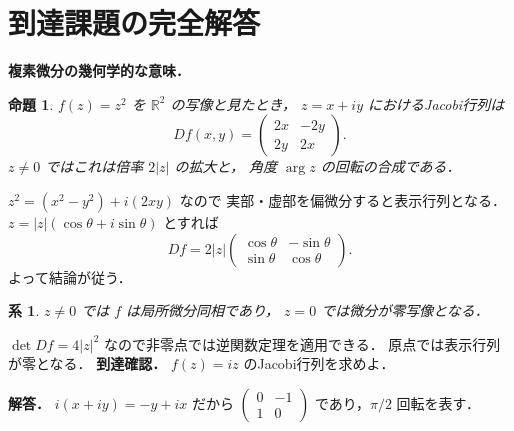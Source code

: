\documentclass[a5paper,10pt,onecolumn]{jsarticle}
\makeatletter
\theoremstyle{mathnotetheorem}
\newtheorem{proposition}[theorem]{命題}
\newtheorem{corollary}[theorem]{系}
\renewcommand{\proofname}{証明}
\renewenvironment{proof}[1][\proofname]{%
  \par\pushQED{\qed}\normalfont\topsep4\p@\@plus2\p@\relax
  \trivlist\item[\hskip\labelsep\bfseries #1]\ignorespaces
}{\popQED\endtrivlist\@endpefalse}
\makeatother
\begin{document}
\section{到達課題の完全解答}
\noindent\textbf{複素微分の幾何学的な意味．}
\begin{proposition}
$f(z)=z^2$ を $\mathbb R^2$ の写像と見たとき，
$z=x+iy$ におけるJacobi行列は
\[
Df(x,y)=\begin{pmatrix}2x&-2y\\2y&2x\end{pmatrix}.
\]
$z\ne0$ ではこれは倍率 $2|z|$ の拡大と，
角度 $\arg z$ の回転の合成である．
\end{proposition}
\begin{proof}
$z^2=(x^2-y^2)+i(2xy)$ なので
実部・虚部を偏微分すると表示行列となる．
$z=|z|(\cos\theta+i\sin\theta)$ とすれば
\[
Df=2|z|
\begin{pmatrix}\cos\theta&-\sin\theta\\
\sin\theta&\cos\theta\end{pmatrix}.
\]
よって結論が従う．
\end{proof}
\begin{corollary}
$z\ne0$ では $f$ は局所微分同相であり，
$z=0$ では微分が零写像となる．
\end{corollary}
\begin{proof}
$\det Df=4|z|^2$ なので非零点では逆関数定理を適用できる．
原点では表示行列が零となる．
\end{proof}
\noindent\textbf{到達確認．}
$f(z)=iz$ のJacobi行列を求めよ．
\par\noindent\textbf{解答．}
$i(x+iy)=-y+ix$ だから
$\left(\begin{smallmatrix}0&-1\\1&0\end{smallmatrix}\right)$
であり，$\pi/2$ 回転を表す．
\end{document}
